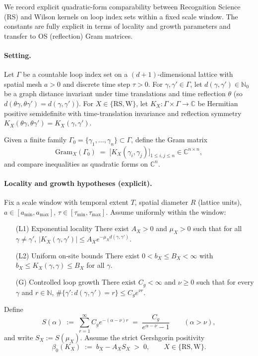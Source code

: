 \documentclass[11pt]{amsart}
\begin{document}
We record explicit quadratic-form comparability between Recognition Science (RS) and Wilson kernels on loop index sets within a fixed scale window. The constants are fully explicit in terms of locality and growth parameters and transfer to OS (reflection) Gram matrices.

\paragraph{Setting.}
Let $\Gamma$ be a countable loop index set on a $(d{+}1)$-dimensional lattice with spatial mesh $a>0$ and discrete time step $\tau>0$. For $\gamma,\gamma'\in\Gamma$, let $d(\gamma,\gamma')\in\mathbb{N}_0$ be a graph distance invariant under time translations and time reflection $\theta$ (so $d(\theta\gamma,\theta\gamma')=d(\gamma,\gamma')$). For $X\in\{\mathrm{RS},\mathrm{W}\}$, let $K_X:\Gamma\times\Gamma\to\mathbb{C}$ be Hermitian positive semidefinite with time-translation invariance and reflection symmetry $K_X(\theta\gamma,\theta\gamma')=K_X(\gamma,\gamma')$.

Given a finite family $\Gamma_0=\{\gamma_1,\ldots,\gamma_n\}\subset\Gamma$, define the Gram matrix
\[
  \mathrm{Gram}_X(\Gamma_0)\;=\;\bigl[K_X(\gamma_i,\gamma_j)\bigr]_{1\le i,j\le n}\in\mathbb{C}^{n\times n},
\]
and compare inequalities as quadratic forms on $\mathbb{C}^n$.

\paragraph{Locality and growth hypotheses (explicit).}
Fix a scale window with temporal extent $T$, spatial diameter $R$ (lattice units), $a\in[a_{\min},a_{\max}]$, $\tau\in[\tau_{\min},\tau_{\max}]$. Assume uniformly within the window:
\begin{itemize}
  \item[(L1) Exponential locality] There exist $A_X>0$ and $\mu_X>0$ such that for all $\gamma\ne\gamma'$, $|K_X(\gamma,\gamma')|\le A_X e^{-\mu_X d(\gamma,\gamma')}$.
  \item[(L2) Uniform on-site bounds] There exist $0<b_X\le B_X<\infty$ with $b_X\le K_X(\gamma,\gamma)\le B_X$ for all $\gamma$.
  \item[(G) Controlled loop growth] There exist $C_g<\infty$ and $\nu\ge 0$ such that for every $\gamma$ and $r\in\mathbb{N}$, $\#\{\gamma': d(\gamma,\gamma')=r\}\le C_g e^{\nu r}$.
\end{itemize}

Define
\[
  S(\alpha)\;:=\;\sum_{r=1}^\infty C_g e^{-(\alpha-\nu) r}\;=\;\frac{C_g}{e^{\alpha-\nu}-1}\qquad (\alpha>\nu),
\]
and write $S_X:=S(\mu_X)$. Assume the strict Gershgorin positivity
\[
  \beta_0(K_X)\;:=\;b_X - A_X S_X\;>\;0,\qquad X\in\{\mathrm{RS},\mathrm{W}\}.
\]
\end{document}

